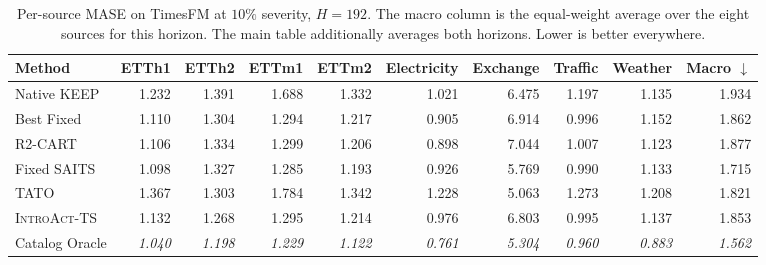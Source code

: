 \documentclass{article}
\newcommand{\oracle}[1]{\textit{\textcolor{phgray}{#1}}}
\newcommand{\introact}{\textsc{IntroAct-TS}}
\begin{document}
\begin{table}[htbp]
  \caption{Per-source MASE on TimesFM at $10\%$ severity, $H=192$. The macro column is the
  equal-weight average over the eight sources for this horizon. The main table additionally averages both horizons. Lower is better everywhere.}
  \label{tab:app-src-tf-192}
  \centering
  \small
  \setlength{\tabcolsep}{3pt}
\begin{tabular*}{\textwidth}{@{\extracolsep{\fill}}lrrrrrrrrr@{}}
    \toprule
    Method & ETTh1 & ETTh2 & ETTm1 & ETTm2 & Electricity & Exchange & Traffic & Weather & Macro $\downarrow$ \\
    \midrule
    Native KEEP & 1.232 & 1.391 & 1.688 & 1.332 & 1.021 & 6.475 & 1.197 & 1.135 & 1.934 \\
    Best Fixed & 1.110 & 1.304 & 1.294 & 1.217 & 0.905 & 6.914 & 0.996 & 1.152 & 1.862 \\
    R2-CART & 1.106 & 1.334 & 1.299 & 1.206 & 0.898 & 7.044 & 1.007 & 1.123 & 1.877 \\
    Fixed SAITS & 1.098 & 1.327 & 1.285 & 1.193 & 0.926 & 5.769 & 0.990 & 1.133 & 1.715 \\
    TATO & 1.367 & 1.303 & 1.784 & 1.342 & 1.228 & 5.063 & 1.273 & 1.208 & 1.821 \\
    \midrule
    \rowcolor{bestgray}\introact{} & 1.132 & 1.268 & 1.295 & 1.214 & 0.976 & 6.803 & 0.995 & 1.137 & 1.853 \\
    \midrule
    Catalog Oracle & \oracle{1.040} & \oracle{1.198} & \oracle{1.229} & \oracle{1.122} & \oracle{0.761} & \oracle{5.304} & \oracle{0.960} & \oracle{0.883} & \oracle{1.562} \\
    \bottomrule
  \end{tabular*}
\end{table}
\end{document}

